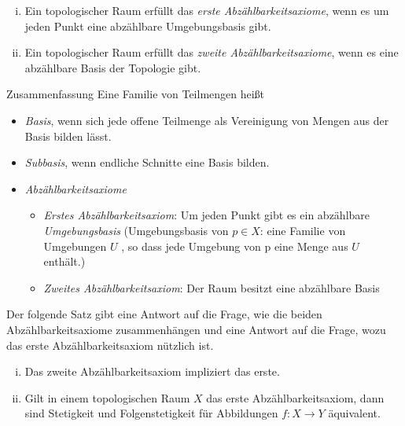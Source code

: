 \documentclass[a4paper,10pt]{scrartcl}
\begin{document}
\begin{df}
 \begin{enumerate}[(i)]
  \item Ein topologischer Raum erfüllt das \emph{erste Abzählbarkeitsaxiome}, wenn es um jeden Punkt eine abzählbare Umgebungsbasis gibt. 
\item Ein topologischer Raum erfüllt das \emph{zweite Abzählbarkeitsaxiome}, wenn es eine abzählbare Basis der Topologie gibt.
 \end{enumerate}
\end{df}
\begin{seg}{Zusammenfassung}
Eine Familie von Teilmengen heißt
\begin{itemize}
 \item \emph{Basis}, wenn sich jede offene Teilmenge als Vereinigung von Mengen aus der Basis bilden lässt.
 \item \emph{Subbasis}, wenn endliche Schnitte eine Basis bilden.
 \item \emph{Abzählbarkeitsaxiome}
 \begin{itemize}
\item \emph{Erstes Abzählbarkeitsaxiom}: Um jeden Punkt gibt es ein abzählbare \emph{Umgebungsbasis} (Umgebungsbasis von $p\in X$: eine Familie von Umgebungen $U$
, so dass jede Umgebung von p eine Menge aus $U$ enthält.)
\item \emph{Zweites Abzählbarkeitsaxiom}: Der Raum besitzt eine abzählbare Basis
\end{itemize}
\end{itemize}
\end{seg}
Der folgende Satz gibt eine Antwort auf die Frage, wie die beiden Abzählbarkeitsaxiome zusammenhängen und eine Antwort auf die Frage, wozu das erste Abzählbarkeitsaxiom nützlich ist.
\begin{st}\label{thm:5.6}
 \begin{enumerate}[(i)]
  \item Das zweite Abzählbarkeitsaxiom impliziert das erste.
  \item Gilt in einem topologischen Raum $X$ das erste Abzählbarkeitsaxiom, dann sind Stetigkeit und Folgenstetigkeit für Abbildungen $f:X\to Y$ äquivalent.
 \end{enumerate}
\end{st}
\end{document}
